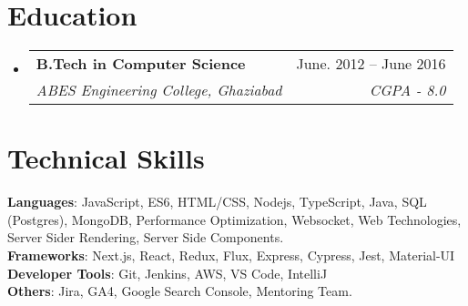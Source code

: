\documentclass[letterpaper,11pt]{article}
\makeatletter
\newcommand{\resumeSubheading}[4]{
  \vspace{-2pt}\item
    \begin{tabular*}{0.97\textwidth}[t]{l@{\extracolsep{\fill}}r}
      \textbf{#1} & #2 \\
      \textit{\small#3} & \textit{\small #4} \\
    \end{tabular*}\vspace{-7pt}
}
\newcommand{\resumeSubHeadingListStart}{\begin{itemize}[leftmargin=0.15in, label={}]}
\newcommand{\resumeSubHeadingListEnd}{\end{itemize}}
\makeatother
\begin{document}
\section{Education}
  \resumeSubHeadingListStart
    \resumeSubheading
      {B.Tech in Computer Science}{June. 2012 -- June 2016}
      {ABES Engineering College, Ghaziabad}{CGPA - 8.0}
  \resumeSubHeadingListEnd


\section{Technical Skills}
 \begin{itemize}[leftmargin=0.15in, label={}]
    \small{\item{
     \textbf{Languages}{: JavaScript, ES6, HTML/CSS, Nodejs, TypeScript, Java, SQL (Postgres), MongoDB, Performance Optimization, Websocket, Web Technologies, Server Sider Rendering, Server Side Components.} \\
     \textbf{Frameworks}{: Next.js, React, Redux, Flux, Express, Cypress, Jest, Material-UI} \\
     \textbf{Developer Tools}{: Git, Jenkins, AWS, VS Code, IntelliJ} \\
     \textbf{Others}{: Jira, GA4, Google Search Console, Mentoring Team.} \\
    }}
 \end{itemize}


\end{document}
